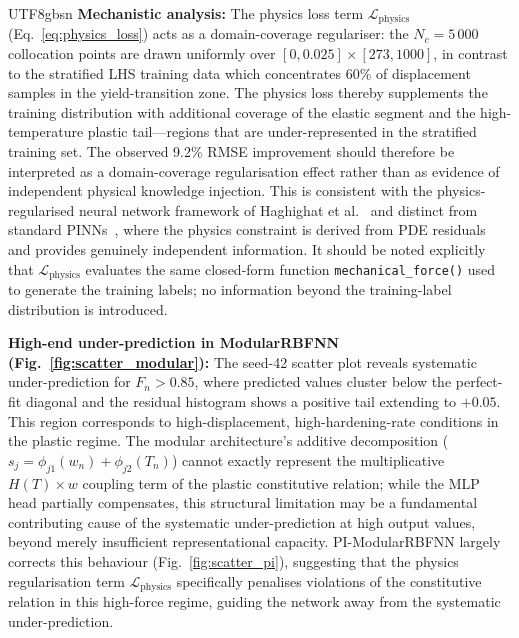 \documentclass[a4paper,12pt]{report}
\newcommand{\Lphys}{\mathcal{L}_{\text{physics}}}
\begin{document}
\begin{CJK}{UTF8}{gbsn}
\textbf{Mechanistic analysis:} The physics loss term $\Lphys$ (Eq.~\eqref{eq:physics_loss})
acts as a domain-coverage regulariser: the $N_c = 5\,000$ collocation points are drawn
uniformly over $[0,0.025]\times[273,1000]$, in contrast to the stratified LHS training
data which concentrates 60\% of displacement samples in the yield-transition zone. The
physics loss thereby supplements the training distribution with additional coverage of the
elastic segment and the high-temperature plastic tail---regions that are under-represented
in the stratified training set. The observed 9.2\% RMSE improvement should therefore be
interpreted as a domain-coverage regularisation effect rather than as evidence of
independent physical knowledge injection. This is consistent with the
physics-regularised neural network framework of Haghighat et al.~\cite{haghighat2021physics}
and distinct from standard PINNs~\cite{raissi2019}, where the physics constraint is derived
from PDE residuals and provides genuinely independent information. It should be noted
explicitly that $\mathcal{L}_{\mathrm{physics}}$ evaluates the same closed-form function
\texttt{mechanical\_force()} used to generate the training labels; no information beyond
the training-label distribution is introduced.

\textbf{High-end under-prediction in ModularRBFNN (Fig.~\ref{fig:scatter_modular}):}
The seed-42 scatter plot reveals systematic under-prediction for $F_n > 0.85$, where
predicted values cluster below the perfect-fit diagonal and the residual histogram
shows a positive tail extending to $+0.05$. This region corresponds to high-displacement, high-hardening-rate conditions in the
plastic regime. The modular architecture's additive decomposition
($s_j = \phi_{j1}(w_n) + \phi_{j2}(T_n)$) cannot exactly represent the multiplicative
$H(T)\times w$ coupling term of the plastic constitutive relation; while the MLP head
partially compensates, this structural limitation may be a fundamental contributing
cause of the systematic under-prediction at high output values, beyond merely insufficient
representational capacity. PI-ModularRBFNN largely corrects this behaviour (Fig.~\ref{fig:scatter_pi}),
suggesting that the physics regularisation term $\Lphys$ specifically penalises
violations of the constitutive relation in this high-force regime, guiding the network
away from the systematic under-prediction.


\end{CJK}
\end{document}
